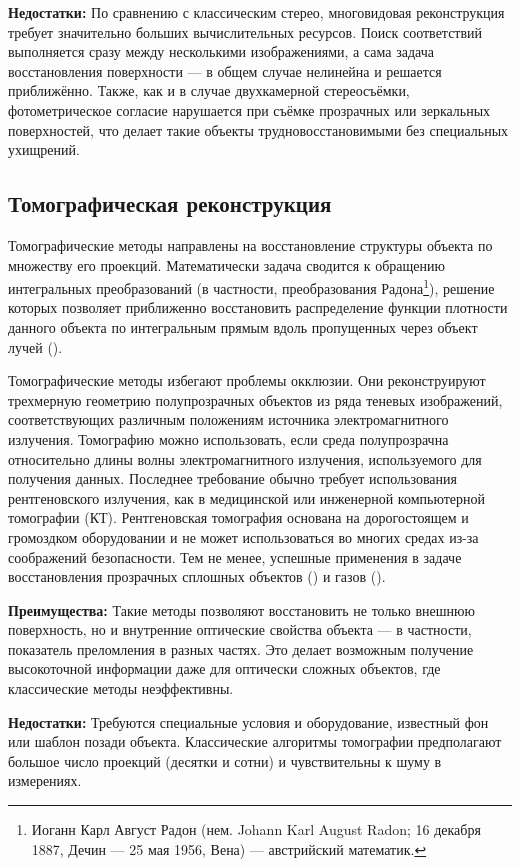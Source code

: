 \textbf{Недостатки:} По сравнению с классическим стерео, многовидовая
реконструкция требует значительно больших вычислительных ресурсов. Поиск
соответствий выполняется сразу между несколькими изображениями, а сама задача
восстановления поверхности — в общем случае нелинейна и решается приближённо.
Также, как и в случае двухкамерной стереосъёмки, фотометрическое согласие
нарушается при съёмке прозрачных или зеркальных поверхностей, что делает такие
объекты трудновосстановимыми без специальных ухищрений.

\subsection{Томографическая реконструкция}

Томографические методы направлены на восстановление структуры объекта
по множеству его проекций. Математически задача сводится к
обращению интегральных преобразований (в частности, преобразования
Радона\footnote{ Иоганн Карл Август Радон (нем. Johann Karl August Radon; 16
декабря 1887, Дечин — 25 мая 1956, Вена) — австрийский математик.  }), решение
которых позволяет приближенно восстановить распределение функции плотности
данного объекта по интегральным прямым вдоль пропущенных через объект лучей
(\cite{book:869357}).

Томографические методы избегают проблемы окклюзии. Они реконструируют трехмерную
геометрию полупрозрачных объектов из ряда теневых изображений, соответствующих
различным положениям источника электромагнитного излучения. Томографию можно
использовать, если среда полупрозрачна относительно длины волны
электромагнитного излучения, используемого для получения данных.  Последнее
требование обычно требует использования рентгеновского излучения, как в
медицинской или инженерной компьютерной томографии (КТ). Рентгеновская
томография основана на дорогостоящем и громоздком оборудовании и не может
использоваться во многих средах из-за соображений безопасности. Тем не менее,
успешные применения в задаче восстановления прозрачных сплошных объектов
(\cite{10.1145/1179849.1179918}) и газов (\cite{IHRKE2006484}).

\textbf{Преимущества:} Такие методы позволяют восстановить не только внешнюю
поверхность, но и внутренние оптические свойства объекта — в частности,
показатель преломления в разных частях. Это делает возможным получение
высокоточной информации даже для оптически сложных объектов, где классические методы
неэффективны.

\textbf{Недостатки:} Требуются специальные условия и оборудование,
известный фон или шаблон позади объекта. Классические алгоритмы томографии
предполагают большое число проекций (десятки и сотни) и чувствительны
к шуму в измерениях.

